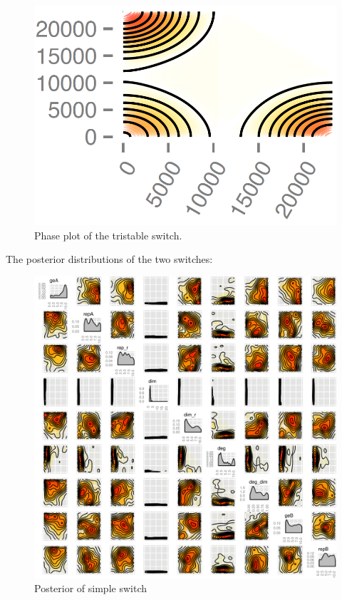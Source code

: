 \begin{figure}[h!]
\begin{center}
\includegraphics[scale=0.2]{chapterStabilityFinder/mass_action_switches/tri_stoch_images/phase_plot_tri.png}
\caption{Phase plot of the tristable switch.}\label{fig_1}
\end{center}
\end{figure}

The posterior distributions of the two switches:

\begin{figure}[htbp]
\begin{center}
\includegraphics[scale=0.15]{chapterStabilityFinder/mass_action_switches/bi_tri_same_priors/posterior_std_tri.png}
\caption{Posterior of simple switch}\label{fig_2}
\end{center}
\end{figure}

